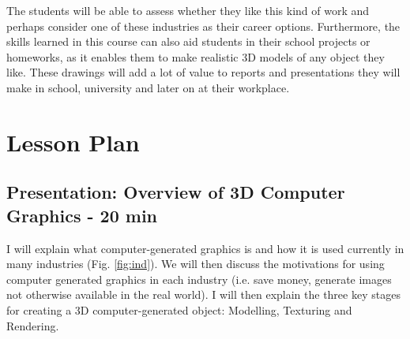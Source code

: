 \documentclass[11pt,a4paper]{article}
\begin{document}
The students will be able to assess whether they like this kind of work and perhaps consider one of these industries as their career options. Furthermore, the skills learned in this course can also aid students in their school projects or homeworks, as it enables them to make realistic 3D models of any object they like. These drawings will add a lot of value to reports and presentations they will make in school, university and later on at their workplace.


\section{Lesson Plan}

\subsection{Presentation: Overview of 3D Computer Graphics - 20 min}


I will explain what computer-generated graphics is and how it is used currently in many industries (Fig. \ref{fig:ind}). We will then discuss the motivations for using computer generated graphics in each industry (i.e. save money, generate images not otherwise available in the real world). I will then explain the three key stages for creating a 3D computer-generated object: Modelling, Texturing and Rendering.
\end{document}
